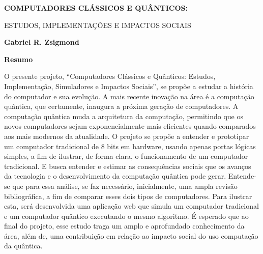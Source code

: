 \thispagestyle{plain}
\begin{center}
    \Large
    \textbf{COMPUTADORES CLÁSSICOS E QUÂNTICOS:}
    
    \vspace{0.2cm}
    \large
    ESTUDOS, IMPLEMENTAÇÕES E IMPACTOS SOCIAIS
    
    \vspace{0.2cm}
    \textbf{Gabriel R. Zsigmond}
    
    \vspace{0.4cm}
    \textbf{Resumo}
\end{center}
O presente projeto, ``Computadores Clássicos e Quânticos: Estudos, Implementação, Simuladores e Impactos Sociais'', se propõe a estudar a história do computador e sua evolução. A mais recente inovação na área é a computação quântica, que certamente, inaugura a próxima geração de computadores. A computação quântica muda a arquitetura da computação, permitindo que os novos computadores sejam exponencialmente mais eficientes quando comparados aos mais modernos da atualidade. O projeto se propõe a entender e prototipar um computador tradicional de 8 bits em hardware, usando apenas portas lógicas simples, a fim de ilustrar, de forma clara, o funcionamento de um computador tradicional. E busca entender e estimar as consequências sociais que os avanços da tecnologia e o desenvolvimento da computação quântica pode gerar. Entende-se que para essa análise, se faz necessário, inicialmente, uma ampla revisão bibliográfica, a fim de comparar esses dois tipos de computadores. Para ilustrar esta, será desenvolvida uma aplicação web que simula um computador tradicional e um computador quântico executando o mesmo algoritmo. É esperado que ao final do projeto, esse estudo traga um amplo e aprofundado conhecimento da área, além de, uma contribuição em relação ao impacto social do uso computação da quântica.